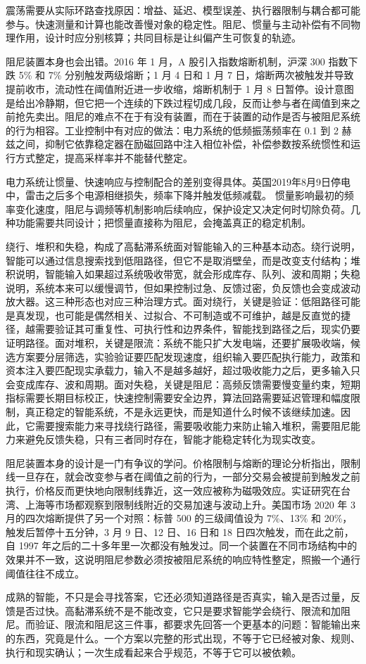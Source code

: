 震荡需要从实际环路查找原因：增益、延迟、模型误差、执行器限制与耦合都可能参与。快速测量和计算也能改善慢对象的稳定性。阻尼、惯量与主动补偿有不同物理作用，设计时应分别核算；共同目标是让纠偏产生可恢复的轨迹。

阻尼装置本身也会出错。2016 年 1 月，A 股引入指数熔断机制，沪深 300 指数下跌 5\% 和 7\% 分别触发两级熔断；1 月 4 日和 1 月 7 日，熔断两次被触发并导致提前收市，流动性在阈值附近进一步收缩，熔断机制于 1 月 8 日暂停。设计意图是给出冷静期，但它把一个连续的下跌过程切成几段，反而让参与者在阈值到来之前抢先卖出。阻尼的难点不在于有没有装置，而在于装置的动作是否与被阻尼系统的行为相容。工业控制中有对应的做法：电力系统的低频振荡频率在 0.1 到 2 赫兹之间，抑制它依靠稳定器在励磁回路中注入相位补偿，补偿参数按系统惯性和运行方式整定，提高采样率并不能替代整定。

电力系统让惯量、快速响应与控制配合的差别变得具体。英国2019年8月9日停电中，雷击之后多个电源相继损失，频率下降并触发低频减载。\cite{nationalgrid2019technical} 惯量影响最初的频率变化速度，阻尼与调频等机制影响后续响应，保护设定又决定何时切除负荷。几种功能需要共同设计；把惯量直接称为阻尼，会掩盖真正的稳定机制。


绕行、堆积和失稳，构成了高黏滞系统面对智能输入的三种基本动态。绕行说明，智能可以通过信息搜索找到低阻路径，但它不是取消壁垒，而是改变支付结构；堆积说明，智能输入如果超过系统吸收带宽，就会形成库存、队列、波和周期；失稳说明，系统本来可以缓慢调节，但如果控制过急、反馈过密，负反馈也会变成波动放大器。这三种形态也对应三种治理方式。面对绕行，关键是验证：低阻路径可能是真发现，也可能是偶然相关、过拟合、不可制造或不可维护，越是反直觉的捷径，越需要验证其可重复性、可执行性和边界条件，智能找到路径之后，现实仍要证明路径。面对堆积，关键是限流：系统不能只扩大发电端，还要扩展吸收端，候选方案要分层筛选，实验验证要匹配发现速度，组织输入要匹配执行能力，政策和资本注入要匹配现实承载力，输入不是越多越好，超过吸收能力之后，更多输入只会变成库存、波和周期。面对失稳，关键是阻尼：高频反馈需要慢变量约束，短期指标需要长期目标校正，快速控制需要安全边界，算法回路需要延迟管理和幅度限制，真正稳定的智能系统，不是永远更快，而是知道什么时候不该继续加速。因此，它需要搜索能力来寻找绕行路径，需要吸收能力来防止输入堆积，需要阻尼能力来避免反馈失稳，只有三者同时存在，智能才能稳定转化为现实改变。

阻尼装置本身的设计是一门有争议的学问。价格限制与熔断的理论分析指出，限制线一旦存在，就会改变参与者在阈值之前的行为，一部分交易会被提前到触发之前执行，价格反而更快地向限制线靠近，这一效应被称为磁吸效应\cite{subrahmanyam1994}。实证研究在台湾、上海等市场都观察到限制线附近的交易加速与波动上升。美国市场 2020 年 3 月的四次熔断提供了另一个对照：标普 500 的三级阈值设为 7\%、13\% 和 20\%，触发后暂停十五分钟，3 月 9 日、12 日、16 日和 18 日四次触发，而在此之前，自 1997 年之后的二十多年里一次都没有触发过。同一个装置在不同市场结构中的效果并不一致，这说明阻尼参数必须按被阻尼系统的响应特性整定，照搬一个通行阈值往往不成立。

成熟的智能，不只是会寻找答案，它还必须知道路径是否真实，输入是否过量，反馈是否过快。高黏滞系统不是不能改变，它只是要求智能学会绕行、限流和加阻尼。而验证、限流和阻尼这三件事，都要求先回答一个更基本的问题：智能输出来的东西，究竟是什么。一个方案以完整的形式出现，不等于它已经被对象、规则、执行和现实确认；一次生成看起来合乎规范，不等于它可以被依赖。
